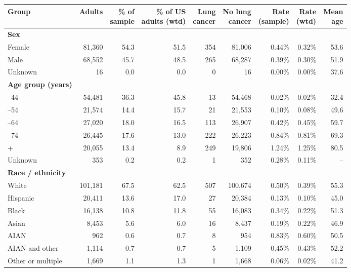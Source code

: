\begin{tabular*}{\textwidth}{@{\extracolsep{\fill}}lrrrrrrrr}
\toprule
Group & Adults & \makecell[b]{\% of\\{}sample} & \makecell[b]{\% of US\\{}adults (wtd)} & \makecell[b]{Lung\\{}cancer} & \makecell[b]{No lung\\{}cancer} & \makecell[b]{Rate\\{}(sample)} & \makecell[b]{Rate\\{}(wtd)} & \makecell[b]{Mean\\{}age} \\
\midrule
\textbf{Sex} &  &  &  &  &  &  &  &  \\
\quad Female & 81,360 & 54.3 & 51.5 & 354 & 81,006 & 0.44\% & 0.32\% & 53.6 \\
\quad Male & 68,552 & 45.7 & 48.5 & 265 & 68,287 & 0.39\% & 0.30\% & 51.9 \\
\quad Unknown & 16 & 0.0 & 0.0 & 0 & 16 & 0.00\% & 0.00\% & 37.6 \\
\midrule
\textbf{Age group (years)} &  &  &  &  &  &  &  &  \\
\quad 18--44 & 54,481 & 36.3 & 45.8 & 13 & 54,468 & 0.02\% & 0.02\% & 32.4 \\
\quad 45--54 & 21,574 & 14.4 & 15.7 & 21 & 21,553 & 0.10\% & 0.08\% & 49.6 \\
\quad 55--64 & 27,020 & 18.0 & 16.5 & 113 & 26,907 & 0.42\% & 0.45\% & 59.7 \\
\quad 65--74 & 26,445 & 17.6 & 13.0 & 222 & 26,223 & 0.84\% & 0.81\% & 69.3 \\
\quad 75+ & 20,055 & 13.4 & 8.9 & 249 & 19,806 & 1.24\% & 1.25\% & 80.5 \\
\quad Unknown & 353 & 0.2 & 0.2 & 1 & 352 & 0.28\% & 0.11\% & -- \\
\midrule
\textbf{Race / ethnicity} &  &  &  &  &  &  &  &  \\
\quad White & 101,181 & 67.5 & 62.5 & 507 & 100,674 & 0.50\% & 0.39\% & 55.3 \\
\quad Hispanic & 20,411 & 13.6 & 17.0 & 27 & 20,384 & 0.13\% & 0.10\% & 45.0 \\
\quad Black & 16,138 & 10.8 & 11.8 & 55 & 16,083 & 0.34\% & 0.22\% & 51.3 \\
\quad Asian & 8,453 & 5.6 & 6.0 & 16 & 8,437 & 0.19\% & 0.22\% & 46.9 \\
\quad AIAN & 962 & 0.6 & 0.7 & 8 & 954 & 0.83\% & 0.60\% & 50.5 \\
\quad AIAN and other & 1,114 & 0.7 & 0.7 & 5 & 1,109 & 0.45\% & 0.43\% & 52.2 \\
\quad Other or multiple & 1,669 & 1.1 & 1.3 & 1 & 1,668 & 0.06\% & 0.02\% & 41.2 \\
\bottomrule
\end{tabular*}
